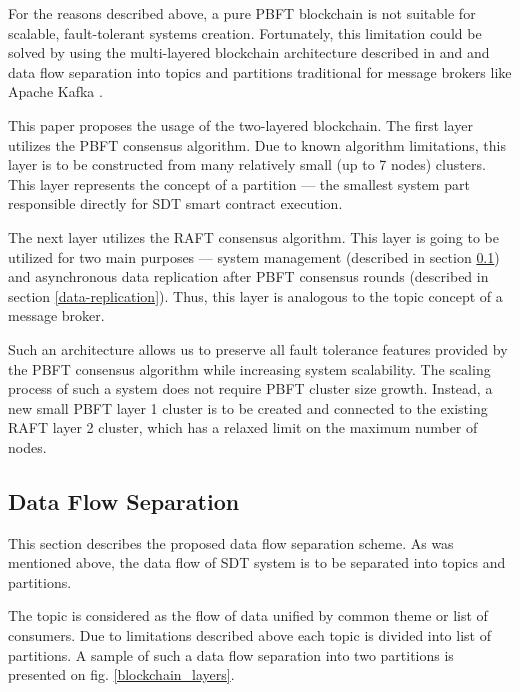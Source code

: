 \documentclass[10pt]{llncs}
\begin{document}
For the reasons described above, a pure PBFT blockchain is not suitable for scalable, fault-tolerant systems creation.
Fortunately, this limitation could be solved by using the multi-layered blockchain architecture described in \cite{Bogdanov2024} and \cite{Lin2023} and 
data flow separation into topics and partitions traditional for message brokers like Apache Kafka \cite{apachekafka}.

This paper proposes the usage of the two-layered blockchain.
The first layer utilizes the PBFT consensus algorithm.
Due to known algorithm limitations, this layer is to be constructed from many relatively small (up to 7 nodes) clusters.
This layer represents the concept of a partition --- the smallest system part responsible directly for SDT smart contract execution.

The next layer utilizes the RAFT \cite{ongaro2015raft} consensus algorithm.
This layer is going to be utilized for two main purposes --- system management (described in section \ref{data-flow}) and asynchronous data replication after PBFT consensus rounds (described in section \ref{data-replication}).
Thus, this layer is analogous to the topic concept of a message broker.

Such an architecture allows us to preserve all fault tolerance features provided by the PBFT consensus algorithm while increasing system scalability.
The scaling process of such a system does not require PBFT cluster size growth. 
Instead, a new small PBFT layer 1 cluster is to be created and connected to the existing RAFT layer 2 cluster, which has a relaxed limit on the maximum number of nodes.

\subsection{Data Flow Separation}\label{data-flow}

This section describes the proposed data flow separation scheme.
As was mentioned above, the data flow of SDT system is to be separated into topics and partitions. 

The topic is considered as the flow of data unified by common theme or list of consumers.
Due to limitations described above each topic is divided into list of partitions.
A sample of such a data flow separation into two partitions is presented on fig. \ref{blockchain_layers}.
\end{document}
